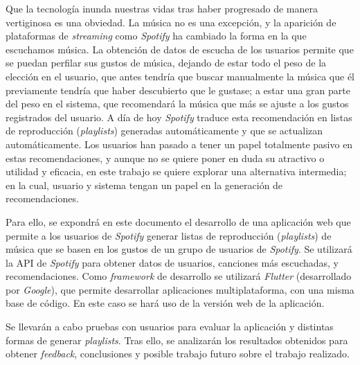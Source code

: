 Que la tecnología inunda nuestras vidas tras haber progresado de manera vertiginosa es una obviedad.
La música no es una excepción, y la aparición de plataformas de \textit{streaming} como \textit{Spotify} ha cambiado la forma en la que escuchamos música.
La obtención de datos de escucha de los usuarios permite que se puedan perfilar sus gustos de música, dejando de estar todo el peso 
de la elección en el usuario, que antes tendría que buscar manualmente la música que él previamente tendría 
que haber descubierto que le gustase; a estar una gran parte del peso en el sistema, que recomendará la música 
que más se ajuste a los gustos registrados del usuario. A día de hoy \textit{Spotify} traduce esta recomendación en listas de reproducción (\textit{playlists})
generadas automáticamente y que se actualizan automáticamente. Los usuarios han pasado a tener un papel totalmente pasivo en estas recomendaciones, y
aunque no se quiere poner en duda su atractivo o utilidad y eficacia, en este trabajo se quiere explorar una alternativa intermedia; en la cual, usuario y sistema
tengan un papel en la generación de recomendaciones.

Para ello, se expondrá en este documento el desarrollo de una aplicación web que permite a los usuarios de \textit{Spotify}
generar listas de reproducción (\textit{playlists}) de música que se basen en los gustos de un grupo de usuarios de \textit{Spotify}. Se utilizará la API de \textit{Spotify}
para obtener datos de usuarios, canciones más escuchadas, y recomendaciones. Como \textit{framework} de desarrollo se utilizará \textit{Flutter} (desarrollado por \textit{Google}), que permite desarrollar aplicaciones
multiplataforma, con una misma base de código. En este caso se hará uso de la versión web de la aplicación.

Se llevarán a cabo pruebas con usuarios para evaluar la aplicación y distintas formas de generar \textit{playlists}. Tras ello, se analizarán los resultados obtenidos para obtener 
\textit{feedback}, conclusiones y posible trabajo futuro sobre el trabajo realizado.

